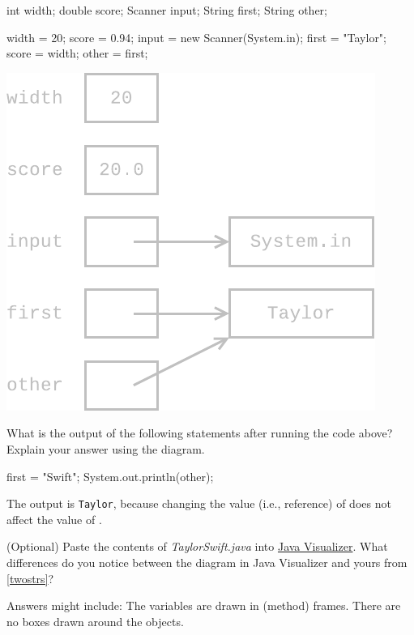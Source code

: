 \begin{multicols}{2}

\begin{javalst}
int width;
double score;
Scanner input;
String first;
String other;

width = 20;
score = 0.94;
input = new Scanner(System.in);
first = "Taylor";
score = width;
other = first;
\end{javalst}

\columnbreak

\begin{answer}[3in]
\includegraphics{reference2.pdf}
\end{answer}

\end{multicols}


\Q What is the output of the following statements after running the code above?
Explain your answer using the diagram.

\begin{javalst}
first = "Swift";
System.out.println(other);
\end{javalst}

\begin{answer}
The output is \texttt{Taylor}, because changing the value (i.e., reference) of  does not affect the value of .
\end{answer}


\Q (Optional) Paste the contents of \textit{TaylorSwift.java} into \href{https://cscircles.cemc.uwaterloo.ca/java_visualize/#code=public+class+ClassNameHere+%7B%0A++++public+static+void+main(String%5B%5D+args)+%7B%0A++++++++%0A++++%7D%0A%7D&mode=edit&showStringsAsObjects=1}{Java Visualizer}.
What differences do you notice between the diagram in Java Visualizer and yours from \ref{twostrs}?

\begin{answer}[5em]
Answers might include:
\bull The variables are drawn in (method) frames.
\bull There are no boxes drawn around the objects.
\end{answer}
